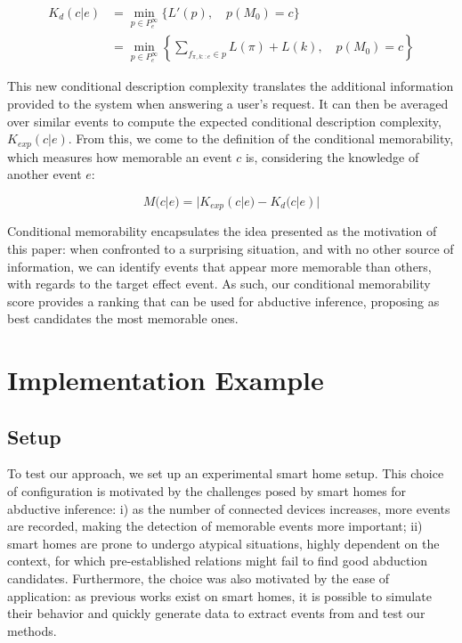 \documentclass[conference]{IEEEtran}
\begin{document}
\begin{align}
  \label{eq:abd_k}
  K_d(c | e) & = \min_{p \in P^\infty_e} \{L'(p), \quad p(M_0)=c \}                                                \\
             & = \min_{p \in P^\infty_e} \left\{\sum_{f_{\pi, k::e} \in p} L(\pi) + L(k), \quad p(M_0) = c\right\}
\end{align}

This new conditional description complexity translates the additional information provided to the
system when answering a user's request. It can then be averaged over similar events to compute the expected conditional description complexity, $K_{exp}(c|e)$. From this, we come to the definition of the conditional memorability, which measures how memorable an event $c$ is, considering the knowledge of another event $e$:

\begin{equation}
\label{eq:cond_mem}
M(c|e) = |K_{exp}(c|e) - K_d(c|e)|
\end{equation}

Conditional memorability encapsulates the idea
presented as the motivation of this paper: when confronted to a surprising
situation, and with no other source of information, we can identify events that appear more memorable than others, with regards to the target effect event. As such, our conditional memorability score provides a ranking that can be used for abductive inference, proposing as best candidates the most memorable ones.

\section{Implementation Example}
\label{sec:example}
\subsection{Setup}
To test our approach, we set up an experimental smart home setup. This choice of
configuration is motivated by the challenges posed by smart homes for abductive
inference: i) as the number of connected devices increases, more events are
recorded, making the detection of memorable events more important; ii) smart
homes are prone to undergo atypical situations, highly dependent on the context,
for which pre-established relations might fail to find good abduction
candidates. Furthermore, the choice was also motivated by the ease of application: as
previous works exist on smart homes, it is possible to simulate their behavior
and quickly generate data to extract events from and test our methods.
\end{document}
